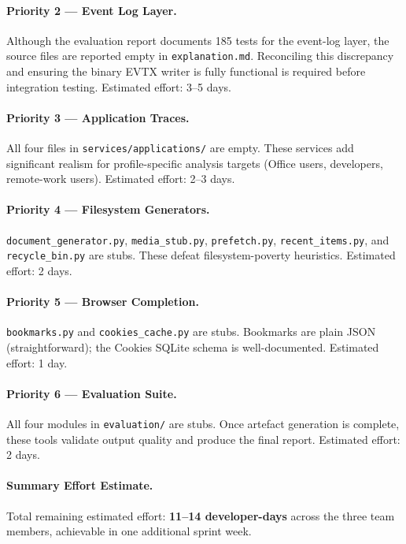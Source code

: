 \documentclass[12pt,a4paper]{article}
\begin{document}
\paragraph{Priority 2 — Event Log Layer.}
Although the evaluation report documents 185 tests for the event-log
layer, the source files are reported empty in \texttt{explanation.md}.
Reconciling this discrepancy and ensuring the binary EVTX writer is fully
functional is required before integration testing.  Estimated effort: 3--5 days.

\paragraph{Priority 3 — Application Traces.}
All four files in \texttt{services/applications/} are empty.  These services
add significant realism for profile-specific analysis targets
(Office users, developers, remote-work users).  Estimated effort: 2--3 days.

\paragraph{Priority 4 — Filesystem Generators.}
\texttt{document\_generator.py}, \texttt{media\_stub.py},
\texttt{prefetch.py}, \texttt{recent\_items.py}, and \texttt{recycle\_bin.py}
are stubs.  These defeat filesystem-poverty heuristics.
Estimated effort: 2 days.

\paragraph{Priority 5 — Browser Completion.}
\texttt{bookmarks.py} and \texttt{cookies\_cache.py} are stubs.
Bookmarks are plain JSON (straightforward); the Cookies SQLite schema is
well-documented.  Estimated effort: 1 day.

\paragraph{Priority 6 — Evaluation Suite.}
All four modules in \texttt{evaluation/} are stubs.  Once artefact generation
is complete, these tools validate output quality and produce the final report.
Estimated effort: 2 days.

\paragraph{Summary Effort Estimate.}
Total remaining estimated effort: \textbf{11--14 developer-days} across the
three team members, achievable in one additional sprint week.
\end{document}
